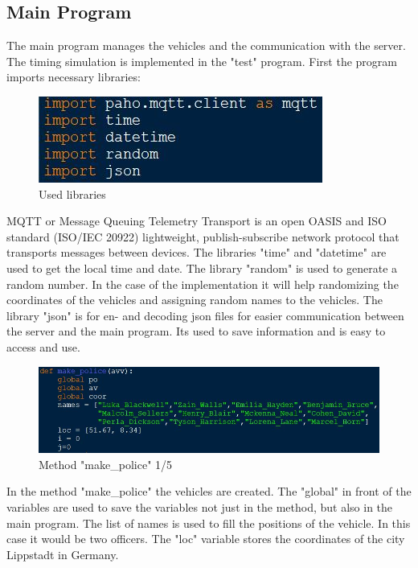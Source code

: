 \subsection{Main Program}
The main program manages the vehicles and the communication with the server. The timing simulation is implemented in the "test" program.
\newline
\newline
First the program imports necessary libraries:
\begin{figure}[!h]
\center
\includegraphics[scale=0.6]{images/Heiber/a0.JPG}
\caption[caption]{Used libraries}
\end{figure}
\newline
MQTT or Message Queuing Telemetry Transport is an open OASIS and ISO standard (ISO/IEC 20922) lightweight, publish-subscribe network protocol that transports messages between devices.
\newline
The libraries "time" and "datetime" are used to get the local time and date.
\newline
The library "random" is used to generate a random number. In the case of the implementation it will help randomizing the coordinates of the vehicles and assigning random names to the vehicles.
\newline
The library "json" is for en- and decoding json files for easier communication between the server and the main program. Its used to save information and is easy to access and use.
\begin{figure}[!h]
\center
\includegraphics[scale=0.6]{images/Heiber/a1.JPG}
\caption[caption]{Method "make\_police" 1/5}
\end{figure}
\newline
In the method "make\_police" the vehicles are created.
The "global" in front of the variables are used to save the variables not just in the method, but also in the main program. The list of names is used to fill the positions of the vehicle. In this case it would be two officers. The "loc" variable stores the coordinates of the city Lippstadt in Germany. 
